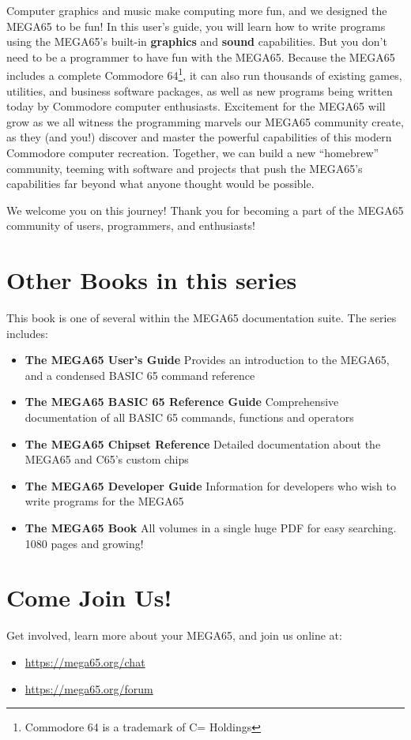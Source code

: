 Computer graphics and music make computing more fun, and we designed the MEGA65 to be fun! In this user's guide, you will learn how to write programs using the MEGA65's built-in {\bf graphics} and {\bf sound} capabilities. But you don't need to be a programmer to have fun with the MEGA65. Because the MEGA65 includes a complete Commodore{\textregistered} 64{\texttrademark}\footnote{Commodore 64 is a trademark of C= Holdings}, it can also run thousands of existing games, utilities, and business software packages, as well as new programs being written today by Commodore computer enthusiasts. Excitement for the MEGA65 will grow as we all witness the programming marvels our MEGA65 community create, as they (and you!) discover and master the powerful capabilities of this modern Commodore computer recreation. Together, we can build a new ``homebrew'' community, teeming with software and projects that push the MEGA65's capabilities far beyond what anyone thought would be possible.

We welcome you on this journey! Thank you for becoming a part of the MEGA65
community of users, programmers, and enthusiasts!

\section{Other Books in this series}

This book is one of several within the MEGA65 documentation suite. The series includes:

\begin{itemize}
  \item {\bf The MEGA65 User's Guide} \newline
      Provides an introduction to the MEGA65, and a condensed BASIC 65 command reference
    \item {\bf The MEGA65 BASIC 65 Reference Guide} \newline
      Comprehensive documentation of all BASIC 65 commands, functions and operators
    \item {\bf The MEGA65 Chipset Reference} \newline
      Detailed documentation about the MEGA65 and C65's custom chips
    \item {\bf The MEGA65 Developer Guide} \newline
      Information for developers who wish to write programs for the MEGA65
    \item {\bf The MEGA65 Book} \newline
      All volumes in a single huge PDF for easy searching. 1080 pages and growing!
\end{itemize}

\section{Come Join Us!}
Get involved, learn more about your MEGA65, and join us online at:

\begin{itemize}
    \item \url{https://mega65.org/chat}
    \item \url{https://mega65.org/forum}
\end{itemize}
